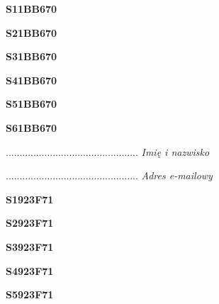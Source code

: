 \begin{turn}{90}\huge \textbf{S11BB670}\end{turn}

\begin{turn}{90}\huge \textbf{S21BB670}\end{turn}

\begin{turn}{90}\huge \textbf{S31BB670}\end{turn}

\begin{turn}{90}\huge \textbf{S41BB670}\end{turn}

\begin{turn}{90}\huge \textbf{S51BB670}\end{turn}

\begin{turn}{90}\huge \textbf{S61BB670}\end{turn}

\begin{turn}{90}\begin{minipage}{\linewidth} \vspace{20mm} ................................................  \textit{Imię i nazwisko}\end{minipage}\end{turn}

\begin{turn}{90}\begin{minipage}{\linewidth} \vspace{20mm} ................................................  \textit{Adres e-mailowy}\end{minipage}\end{turn}

\begin{turn}{90}\huge \textbf{S1923F71}\end{turn}

\begin{turn}{90}\huge \textbf{S2923F71}\end{turn}

\begin{turn}{90}\huge \textbf{S3923F71}\end{turn}

\begin{turn}{90}\huge \textbf{S4923F71}\end{turn}

\begin{turn}{90}\huge \textbf{S5923F71}\end{turn}

